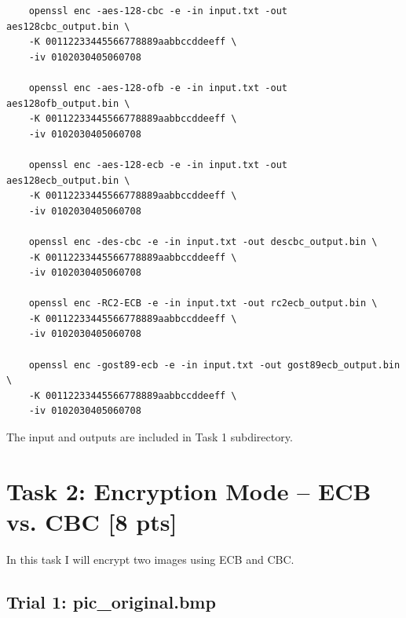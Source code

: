 \documentclass{article}
\begin{document}
\begin{verbatim}
    openssl enc -aes-128-cbc -e -in input.txt -out aes128cbc_output.bin \
    -K 00112233445566778889aabbccddeeff \
    -iv 0102030405060708
    
    openssl enc -aes-128-ofb -e -in input.txt -out aes128ofb_output.bin \
    -K 00112233445566778889aabbccddeeff \
    -iv 0102030405060708
    
    openssl enc -aes-128-ecb -e -in input.txt -out aes128ecb_output.bin \
    -K 00112233445566778889aabbccddeeff \
    -iv 0102030405060708
    
    openssl enc -des-cbc -e -in input.txt -out descbc_output.bin \
    -K 00112233445566778889aabbccddeeff \
    -iv 0102030405060708
    
    openssl enc -RC2-ECB -e -in input.txt -out rc2ecb_output.bin \
    -K 00112233445566778889aabbccddeeff \
    -iv 0102030405060708
    
    openssl enc -gost89-ecb -e -in input.txt -out gost89ecb_output.bin \
    -K 00112233445566778889aabbccddeeff \
    -iv 0102030405060708
\end{verbatim}

The input and outputs are included in Task 1 subdirectory.

\section{Task 2: Encryption Mode – ECB vs. CBC [8 pts]}
In this task I will encrypt two images using ECB and CBC.
\subsection{Trial 1: pic\_original.bmp}
\end{document}
